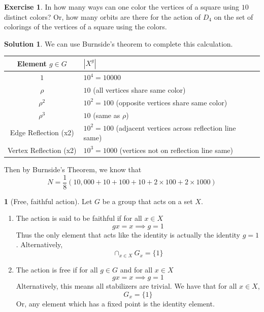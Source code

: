 \documentclass[12pt]{article}
\theoremstyle{definition}
\newtheorem{definition}{\color{NavyBlue}{\textbf{Definition}}}
\newtheorem{exercise}{\color{YellowOrange}Exercise}
\theoremstyle{definition}
\newtheorem{solution}{\color{Goldenrod}Solution}
\begin{document}
\begin{exercise}
In how many ways can one color the vertices of a square using $10$ distinct colors? Or, how many orbits are there for the action of $D_4$ on the set of colorings of the vertices of a square using the colors. 
\end{exercise}
\begin{solution}
	We can use Burnside's theorem to complete this calculation.
	\begin{center}
	\begin{tabular}{c|l}
	Element $g \in G$ & $|X^g|$ \\
	\hline 
	$1$ & $10^4 = 10000$ \\
	$\rho$ & $10$ (all vertices share same color) \\
	$\rho^2$ & $10^2 = 100$ (opposite vertices share same color) \\
	$\rho^3$ & $10$ (same as $\rho$)\\
	Edge Reflection (x2) & $10^2 = 100$ (adjacent vertices across reflection line same) \\
	Vertex Reflection (x2) & $10^3 = 1000$ (vertices not on reflection line same)
	\end{tabular}
	\end{center}
	Then by Burnside's Theorem, we know that
	\begin{equation}
		N = \frac{1}{8}(10,000 + 10 + 100 + 10 + 2 \times 100 + 2 \times 1000)
	\end{equation}
\end{solution}

\begin{definition}[Free, faithful action]
	Let $G$ be a group that acts on a set $X$. 
	\begin{enumerate}
		\item The action is said to be faithful if for all $x \in X$
		\begin{equation}
			gx = x \implies g = 1
		\end{equation}
		Thus the only element that acts like the identity is actually the identity $g=1$. Alternatively, 
		\begin{equation}
			\cap_{x \in X} G_x = \{1\}
		\end{equation}
		\item The action is free if for all $g\in G$ and for all $x \in X$
		\begin{equation}
			gx = x \implies g = 1
		\end{equation}
		Alternatively, this means all stabilizers are trivial. We have that for all $x \in X$, 
		\begin{equation}
			G_x = \{1\}
		\end{equation}
		 Or, any element which has a fixed point is the identity element. 
	\end{enumerate}
\end{definition}
\end{document}
